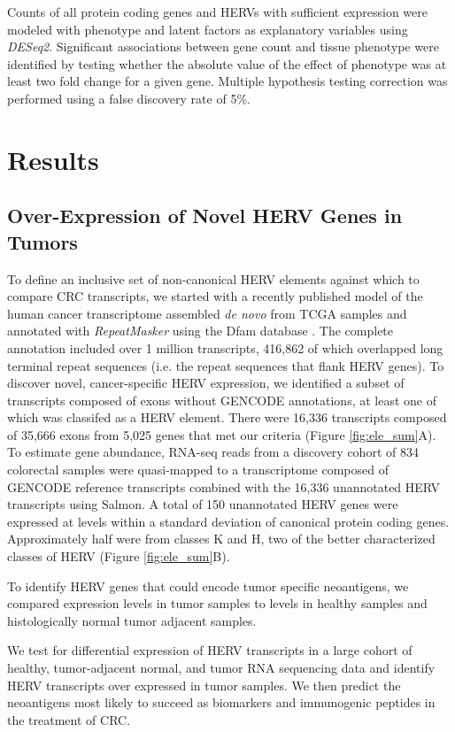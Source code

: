 \documentclass[11pt,letterpaper]{article}
\begin{document}
Counts of all protein coding genes and HERVs with sufficient expression were modeled with phenotype and latent factors as explanatory variables using \emph{DESeq2}.
Significant associations between gene count and tissue phenotype were identified by testing whether the absolute value of the effect of phenotype was at least two fold change for a given gene.
Multiple hypothesis testing correction was performed using a false discovery rate of 5\%.

\section*{Results}
\subsection*{Over-Expression of Novel HERV Genes in Tumors}
To define an inclusive set of non-canonical HERV elements against which to compare CRC transcripts, we started with a recently published model of the human cancer transcriptome assembled \emph{de novo} from TCGA samples and annotated with \emph{RepeatMasker} using the Dfam database \citep{Attig2019}.
The complete annotation included over 1 million transcripts, 416,862 of which overlapped long terminal repeat sequences (i.e. the repeat sequences that flank HERV genes).
To discover novel, cancer-specific HERV expression, we identified a subset of transcripts composed of exons without GENCODE annotations, at least one of which was classifed as a HERV element.
There were 16,336 transcripts composed of 35,666 exons from 5,025 genes that met our criteria (Figure \ref{fig:ele_sum}A).
To estimate gene abundance, RNA-seq reads from a discovery cohort of 834 colorectal samples were quasi-mapped to a transcriptome composed of GENCODE reference transcripts combined with the 16,336 unannotated HERV transcripts using Salmon.
A total of 150 unannotated HERV genes were expressed at levels within a standard deviation of canonical protein coding genes.
Approximately half were from classes K and H, two of the better characterized classes of HERV (Figure \ref{fig:ele_sum}B).

To identify HERV genes that could encode tumor specific neoantigens, we compared expression levels in tumor samples to levels in healthy samples and histologically normal tumor adjacent samples.




We test for differential expression of HERV transcripts in a large cohort of healthy, tumor-adjacent normal, and tumor RNA sequencing data and identify HERV transcripts over expressed in tumor samples.
We then predict the neoantigens most likely to succeed as biomarkers and immunogenic peptides in the treatment of CRC.
\end{document}
